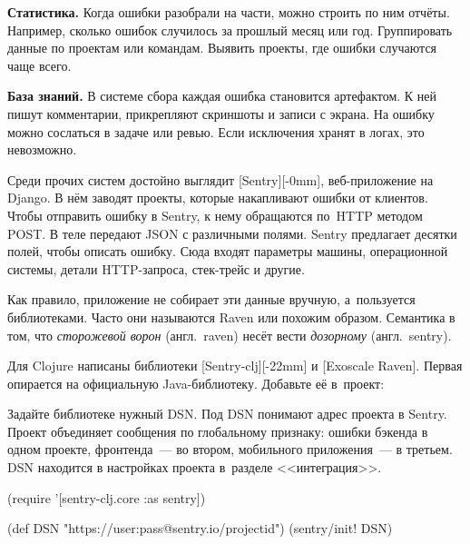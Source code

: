 \textbf{Статистика.} Когда ошибки разобрали на части, можно строить по ним
отчёты. Например, сколько ошибок случилось за прошлый месяц или
год. Группировать данные по проектам или командам. Выявить проекты, где ошибки
случаются чаще всего.

\textbf{База знаний.} В системе сбора каждая ошибка становится артефактом. К ней
пишут комментарии, прикрепляют скриншоты и записи с экрана. На ошибку можно
сослаться в задаче или ревью. Если исключения хранят в логах, это невозможно.


Среди прочих систем достойно выглядит [Sentry][-0mm],
веб-приложение на Django. В нём заводят проекты, которые накапливают ошибки
от клиентов. Чтобы отправить ошибку в Sentry, к нему обращаются по~HTTP методом
POST. В теле передают JSON с различными полями. Sentry предлагает десятки полей,
чтобы описать ошибку. Сюда входят параметры машины, операционной системы, детали
HTTP-запроса, стек-трейс и другие.


Как правило, приложение не собирает эти данные вручную, а~пользуется
библиотеками. Часто они называются Raven или похожим образом. Семантика в том,
что \emph{сторожевой ворон} (англ.~raven) несёт вести \emph{дозорному}
(англ.~sentry).

Для Clojure написаны библиотеки [Sentry-clj][-22mm] и
[Exoscale Raven]. Первая опирается на
официальную Java-библиотеку. Добавьте её в~проект:

\begin{english}
  \begin{clojure}
  \end{clojure}
\end{english}


Задайте библиотеке нужный DSN. Под DSN понимают адрес проекта в Sentry. Проект
объединяет сообщения по глобальному признаку: ошибки бэкенда в одном проекте,
фронтенда~--- во втором, мобильного приложения~--- в третьем. DSN находится в
настройках проекта в~разделе <<интеграция>>.

\ifx\DEVICETYPE\MOBILE

\begin{english}
  \begin{clojure}
(require '[sentry-clj.core :as sentry])

(def DSN
 "https://user:pass@sentry.io/projectid")
(sentry/init! DSN)
  \end{clojure}
\end{english}

